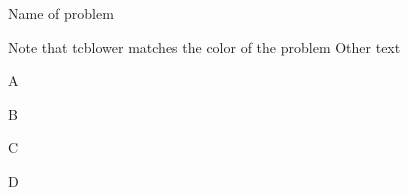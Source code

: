 \begin{newProblem}{Name of problem}
    \begin{newInlineProblem}[NOTE]
    Note that tcblower matches the color of the problem
    \tcblower
    Other text
    \end{newInlineProblem}
\tcblower

\end{newProblem}
\begin{newProblem}[UNFINISHED]{}
    \begin{newInlineProblem}{A}
    \tcblower
    \end{newInlineProblem}
    \begin{newInlineProblem}[UNFINISHED]{B}
    \tcblower
    \end{newInlineProblem}
    \begin{newInlineProblem}[UNFINISHED]{C}
    \tcblower
    \end{newInlineProblem}
    \begin{newInlineProblem}[OPTIONAL]{D}
    \tcblower 
    \end{newInlineProblem}
\end{newProblem}

\begin{newProblem}
\begin{newInlineProblem}[UNFINISHED]
\tcblower 
\end{newInlineProblem}
\tcblower
\begin{newInlineProblem}[NOTE]
\tcblower
\end{newInlineProblem}
\end{newProblem}

\tcblower
